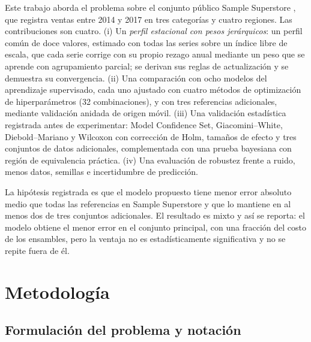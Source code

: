 \documentclass[pdflatex,sn-mathphys-num]{sn-jnl}
\theoremstyle{thmstyleone}
\begin{document}
Este trabajo aborda el problema sobre el conjunto público Sample Superstore \cite{superstore}, que registra ventas entre 2014 y 2017 en tres categorías y cuatro regiones. Las contribuciones son cuatro. (i) Un \emph{perfil estacional con pesos jerárquicos}: un perfil común de doce valores, estimado con todas las series sobre un índice libre de escala, que cada serie corrige con su propio rezago anual mediante un peso que se aprende con agrupamiento parcial; se derivan sus reglas de actualización y se demuestra su convergencia. (ii) Una comparación con ocho modelos del aprendizaje supervisado, cada uno ajustado con cuatro métodos de optimización de hiperparámetros (32 combinaciones), y con tres referencias adicionales, mediante validación anidada de origen móvil. (iii) Una validación estadística registrada antes de experimentar: Model Confidence Set, Giacomini--White, Diebold--Mariano y Wilcoxon con corrección de Holm, tamaños de efecto y tres conjuntos de datos adicionales, complementada con una prueba bayesiana con región de equivalencia práctica. (iv) Una evaluación de robustez frente a ruido, menos datos, semillas e incertidumbre de predicción.

La hipótesis registrada es que el modelo propuesto tiene menor error absoluto medio que todas las referencias en Sample Superstore y que lo mantiene en al menos dos de tres conjuntos adicionales. El resultado es mixto y así se reporta: el modelo obtiene el menor error en el conjunto principal, con una fracción del costo de los ensambles, pero la ventaja no es estadísticamente significativa y no se repite fuera de él.

\section{Metodología}\label{sec:metodologia}

\subsection{Formulación del problema y notación}\label{subsec:formulacion}
\end{document}
